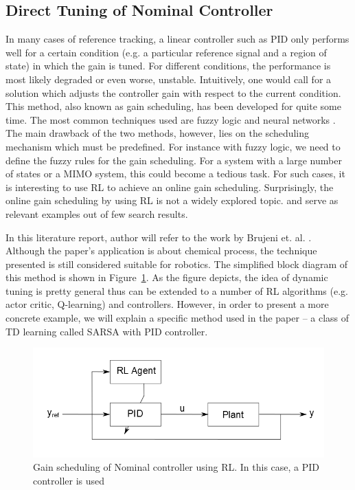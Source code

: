 \subsection{Direct Tuning of Nominal Controller}
In many cases of reference tracking, a linear controller such as PID only performs well for a certain condition (e.g. a particular reference signal and a region of state) in which the gain is tuned. For different conditions, the performance is most likely degraded or even worse, unstable. Intuitively, one would call for a solution which adjusts the controller gain with respect to the current condition. This method, also known as gain scheduling, has been developed for quite some time. The most common techniques used are fuzzy logic \cite{375142} \cite{5229855} \cite{1684589} and neural networks \cite{6606304} \cite{572744} \cite{556252}. The main drawback of the two methods, however, lies on the scheduling mechanism which must be predefined. For instance with fuzzy logic, we need to define the fuzzy rules for the gain scheduling. For a system with a large number of states or a \ac {MIMO} system, this could become a tedious task. For such cases, it is interesting to use \ac {RL} to achieve an online gain scheduling. Surprisingly, the online gain scheduling by using \ac {RL} is not a widely explored topic. \cite{882916} and \cite{Brujeni5669655} serve as relevant examples out of few search results.

In this literature report, author will refer to the work by Brujeni et. al. \cite{Brujeni5669655}. Although the paper's application is about chemical process, the technique presented is still considered suitable for robotics. The simplified block diagram of this method is shown in Figure~\ref{fig:dynamictuning}. As the figure depicts, the idea of dynamic tuning is pretty general thus can be extended to a number of \ac {RL} algorithms (e.g. actor critic, Q-learning) and controllers. However, in order to present a more concrete example, we will explain a specific method used in the paper -- a class of \ac {TD} learning called \ac{SARSA} with PID controller. 

\begin{figure}[h!]
	\centering
	\includegraphics[width=0.7\linewidth]{dynamictuning}
	\caption{Gain scheduling of Nominal controller using \ac {RL}. In this case, a PID controller is used}
	\label{fig:dynamictuning}
\end{figure}
	
